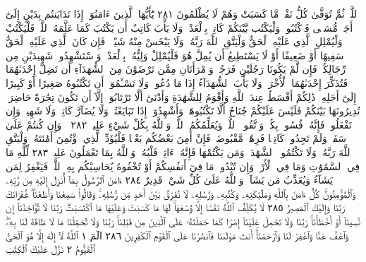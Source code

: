 ٱللَّهِۖ ثُمَّ تُوَفَّىٰ كُلُّ نَفْسࣲ مَّا كَسَبَتْ وَهُمْ لَا يُظْلَمُونَ ٢٨١
يَٰٓأَيُّهَا ٱلَّذِينَ ءَامَنُوٓا۟ إِذَا تَدَايَنتُم بِدَيْنٍ إِلَىٰٓ أَجَلࣲ مُّسَمࣰّى
فَٱكْتُبُوهُۚ وَلْيَكْتُب بَّيْنَكُمْ كَاتِبُۢ بِٱلْعَدْلِۚ وَلَا يَأْبَ
كَاتِبٌ أَن يَكْتُبَ كَمَا عَلَّمَهُ ٱللَّهُۚ فَلْيَكْتُبْ وَلْيُمْلِلِ
ٱلَّذِي عَلَيْهِ ٱلْحَقُّ وَلْيَتَّقِ ٱللَّهَ رَبَّهُۥ وَلَا يَبْخَسْ مِنْهُ شَيْـࣰٔاۚ
فَإِن كَانَ ٱلَّذِي عَلَيْهِ ٱلْحَقُّ سَفِيهًا أَوْ ضَعِيفًا أَوْ لَا يَسْتَطِيعُ
أَن يُمِلَّ هُوَ فَلْيُمْلِلْ وَلِيُّهُۥ بِٱلْعَدْلِۚ وَٱسْتَشْهِدُوا۟ شَهِيدَيْنِ
مِن رِّجَالِكُمْۖ فَإِن لَّمْ يَكُونَا رَجُلَيْنِ فَرَجُلࣱ وَٱمْرَأَتَانِ
مِمَّن تَرْضَوْنَ مِنَ ٱلشُّهَدَآءِ أَن تَضِلَّ إِحْدَىٰهُمَا فَتُذَكِّرَ
إِحْدَىٰهُمَا ٱلْأُخْرَىٰۚ وَلَا يَأْبَ ٱلشُّهَدَآءُ إِذَا مَا دُعُوا۟ۚ وَلَا تَسْـَٔمُوٓا۟
أَن تَكْتُبُوهُ صَغِيرًا أَوْ كَبِيرًا إِلَىٰٓ أَجَلِهِۦۚ ذَٰلِكُمْ أَقْسَطُ
عِندَ ٱللَّهِ وَأَقْوَمُ لِلشَّهَٰدَةِ وَأَدْنَىٰٓ أَلَّا تَرْتَابُوٓا۟ إِلَّآ أَن تَكُونَ
تِجَٰرَةً حَاضِرَةࣰ تُدِيرُونَهَا بَيْنَكُمْ فَلَيْسَ عَلَيْكُمْ جُنَاحٌ
أَلَّا تَكْتُبُوهَاۗ وَأَشْهِدُوٓا۟ إِذَا تَبَايَعْتُمْۚ وَلَا يُضَآرَّ كَاتِبࣱ
وَلَا شَهِيدࣱۚ وَإِن تَفْعَلُوا۟ فَإِنَّهُۥ فُسُوقُۢ بِكُمْۗ وَٱتَّقُوا۟
ٱللَّهَۖ وَيُعَلِّمُكُمُ ٱللَّهُۗ وَٱللَّهُ بِكُلِّ شَيْءٍ عَلِيمࣱ ٢٨٢
۞ وَإِن كُنتُمْ عَلَىٰ سَفَرࣲ وَلَمْ تَجِدُوا۟ كَاتِبࣰا فَرِهَٰنࣱ مَّقْبُوضَةࣱۖ
فَإِنْ أَمِنَ بَعْضُكُم بَعْضࣰا فَلْيُؤَدِّ ٱلَّذِي ٱؤْتُمِنَ أَمَٰنَتَهُۥ وَلْيَتَّقِ
ٱللَّهَ رَبَّهُۥۗ وَلَا تَكْتُمُوا۟ ٱلشَّهَٰدَةَۚ وَمَن يَكْتُمْهَا فَإِنَّهُۥٓ
ءَاثِمࣱ قَلْبُهُۥۗ وَٱللَّهُ بِمَا تَعْمَلُونَ عَلِيمࣱ ٢٨٣ لِّلَّهِ مَا فِي ٱلسَّمَٰوَٰتِ
وَمَا فِي ٱلْأَرْضِۗ وَإِن تُبْدُوا۟ مَا فِيٓ أَنفُسِكُمْ أَوْ تُخْفُوهُ
يُحَاسِبْكُم بِهِ ٱللَّهُۖ فَيَغْفِرُ لِمَن يَشَآءُ وَيُعَذِّبُ مَن يَشَآءُۗ
وَٱللَّهُ عَلَىٰ كُلِّ شَيْءࣲ قَدِيرٌ ٢٨٤ ءَامَنَ ٱلرَّسُولُ بِمَآ أُنزِلَ إِلَيْهِ
مِن رَّبِّهِۦ وَٱلْمُؤْمِنُونَۚ كُلٌّ ءَامَنَ بِٱللَّهِ وَمَلَٰٓئِكَتِهِۦ
وَكُتُبِهِۦ وَرُسُلِهِۦ لَا نُفَرِّقُ بَيْنَ أَحَدࣲ مِّن رُّسُلِهِۦۚ وَقَالُوا۟
سَمِعْنَا وَأَطَعْنَاۖ غُفْرَانَكَ رَبَّنَا وَإِلَيْكَ ٱلْمَصِيرُ ٢٨٥ لَا يُكَلِّفُ
ٱللَّهُ نَفْسًا إِلَّا وُسْعَهَاۚ لَهَا مَا كَسَبَتْ وَعَلَيْهَا مَا ٱكْتَسَبَتْۗ
رَبَّنَا لَا تُؤَاخِذْنَآ إِن نَّسِينَآ أَوْ أَخْطَأْنَاۚ رَبَّنَا وَلَا تَحْمِلْ
عَلَيْنَآ إِصْرࣰا كَمَا حَمَلْتَهُۥ عَلَى ٱلَّذِينَ مِن قَبْلِنَاۚ رَبَّنَا
وَلَا تُحَمِّلْنَا مَا لَا طَاقَةَ لَنَا بِهِۦۖ وَٱعْفُ عَنَّا وَٱغْفِرْ لَنَا
وَٱرْحَمْنَآۚ أَنتَ مَوْلَىٰنَا فَٱنصُرْنَا عَلَى ٱلْقَوْمِ ٱلْكَٰفِرِينَ ٢٨٦
الٓمٓ ١ ٱللَّهُ لَآ إِلَٰهَ إِلَّا هُوَ ٱلْحَيُّ ٱلْقَيُّومُ ٢ نَزَّلَ عَلَيْكَ ٱلْكِتَٰبَ
